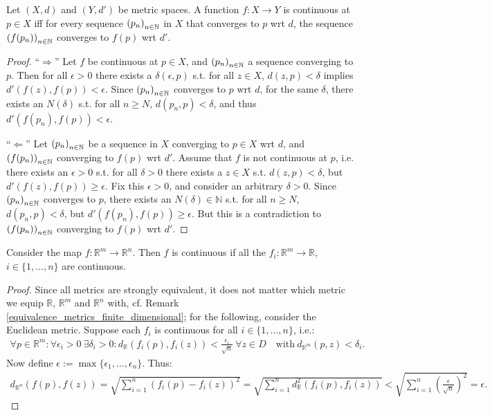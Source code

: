\begin{theorem}
	Let $(X, d)$ and $(Y, d')$ be metric spaces. A function $f: X\to Y$ is continuous at $p\in X$ iff for every sequence $\seq[p_n]$ in $X$ that converges to $p$ wrt $d$, the sequence $\seq[f(p_n)]$ converges to $f(p)$ wrt $d'$.
\end{theorem}

\begin{proof}
	\enquote{$\Longrightarrow$} Let $f$ be continuous at $p\in X$, and $\seq[p_n]$ a sequence converging to $p$. Then for all $\epsilon > 0$ there exists a $\delta(\epsilon, p)$ s.t. for all $z\in X$, $d(z, p) < \delta$ implies $d'(f(z), f(p)) < \epsilon$. Since $\seq[p_n]$ converges to $p$ wrt $d$, for the same $\delta$, there exists an $N(\delta)$ s.t. for all $n\geq N$, $d(p_n, p) < \delta$, and thus $d'(f(p_n), f(p)) < \epsilon$.
	
	\enquote{$\Longleftarrow$} Let $\seq[p_n]$ be a sequence in $X$ converging to $p\in X$ wrt $d$, and $\seq[f(p_n)]$ converging to $f(p)$ wrt $d'$. Assume that $f$ is not continuous at $p$, i.e. there exists an $\epsilon > 0$ s.t. for all $\delta > 0$ there exists a $z\in X$ s.t. $d(z, p) < \delta$, but $d'(f(z), f(p)) \geq \epsilon$. Fix this $\epsilon > 0$, and consider an arbitrary $\delta > 0$. Since $\seq[p_n]$ converges to $p$, there exists an $N(\delta)\in\mathbb N$ s.t. for all $n\geq N$, $d(p_n, p) < \delta$, but $d'(f(p_n), f(p)) \geq \epsilon$. But this is a contradiction to $\seq[f(p_n)]$ converging to $f(p)$ wrt $d'$.
\end{proof}

\begin{lemma}\label{continuity_vector_components}
	Consider the map $f: \mathbb R^m\rightarrow\mathbb R^n$. Then $f$ is continuous if all the $f_i: \mathbb R^m\rightarrow\mathbb R$, $i\in\{1, \dots, n\}$ are continuous. 
\end{lemma}
\begin{proof}
	Since all metrics are strongly equivalent, it does not matter which metric we equip $\mathbb R$, $\mathbb R^m$ and $\mathbb R^n$ with, cf. Remark \ref{equivalence_metrics_finite_dimensional}; for the following, consider the Euclidean metric. Suppose each $f_i$ is continuous for all $i\in \{1, \dots, n\}$, i.e.: 
	\begin{align} 
		\forall p\in\mathbb R^m: \forall \epsilon_i > 0 \ \exists 
		\delta_i>0: d_{\mathbb R}(f_i(p), f_i(z)) < \frac{\epsilon_i}{\sqrt{n}} \ \forall z\in D \quad \text{with}\ d_{\mathbb R^m}(p, z) < \delta_i. 
	\end{align} 
	Now define $\epsilon:= \max\{\epsilon_1, \dots, \epsilon_n\}$. Thus: 
	\begin{align}
		d_{\mathbb R^n}(f(p), f(z)) = \sqrt{\sum_{i=1}^{n}\left(f_i(p)-f_i(z)\right)^2} 
		= \sqrt{\sum_{i=1}^{n}d^2_{\mathbb R}\left(f_i(p), f_i(z)\right)} < \sqrt{\sum_{i=1}^{n}\left(\frac{\epsilon}{\sqrt{n}}\right)^2} = \epsilon. 
	\end{align}
\end{proof}

